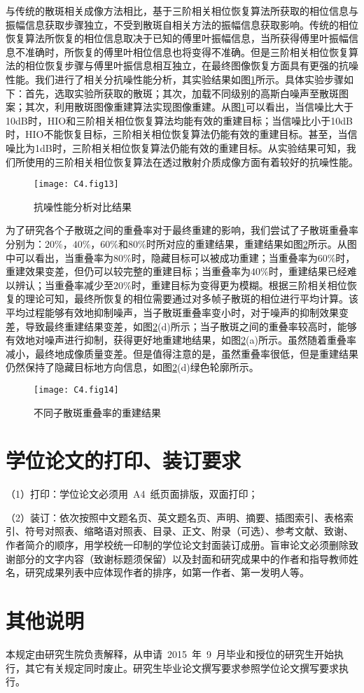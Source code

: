 与传统的散斑相关成像方法相比，基于三阶相关相位恢复算法所获取的相位信息与振幅信息获取步骤独立，不受到散斑自相关方法的振幅信息获取影响。传统的相位恢复算法所恢复的相位信息取决于已知的傅里叶振幅信息，当所获得傅里叶振幅信息不准确时，所恢复的傅里叶相位信息也将变得不准确。但是三阶相关相位恢复算法的相位恢复步骤与傅里叶振信息相互独立，在最终图像恢复方面具有更强的抗噪性能。我们进行了相关分抗噪性能分析，其实验结果如图\ref{fig:4.13}所示。具体实验步骤如下：首先，选取实验所获取的散斑；其次，加载不同级别的高斯白噪声至散斑图案；其次，利用散斑图像重建算法实现图像重建。从图\ref{fig:4.13}可以看出，当信噪比大于10dB时，HIO和三阶相关相位恢复算法均能有效的重建目标；当信噪比小于10dB时，HIO不能恢复目标，三阶相关相位恢复算法仍能有效的重建目标。甚至，当信噪比为1dB时，三阶相关相位恢复算法仍能有效的重建目标。从实验结果可知，我们所使用的三阶相关相位恢复算法在透过散射介质成像方面有着较好的抗噪性能。

\begin{figure}[htp]
	\centering
	\texttt{[image: C4.fig13]}
	\caption{抗噪性能分析对比结果}
	\label{fig:4.13}
\end{figure}

为了研究各个子散斑之间的重叠率对于最终重建的影响，我们尝试了子散斑重叠率分别为：$20\%$，$40\%$，$60\%$和$80\%$时所对应的重建结果，重建结果如图\ref{fig:4.14}所示。从图中可以看出，当重叠率为$80\%$时，隐藏目标可以被成功重建；当重叠率为$60\%$时，重建效果变差，但仍可以较完整的重建目标；当重叠率为$40\%$时，重建结果已经难以辨认；当重叠率减少至$20\%$时，重建目标为变得更为模糊。根据三阶相关相位恢复的理论可知，最终所恢复的相位需要通过对多帧子散斑的相位进行平均计算。该平均过程能够有效地抑制噪声，当子散斑重叠率变小时，对于噪声的抑制效果变差，导致最终重建结果变差，如图\ref{fig:4.14}(d)所示；当子散斑之间的重叠率较高时，能够有效地对噪声进行抑制，获得更好地重建地结果，如图\ref{fig:4.14}(a)所示。虽然随着重叠率减小，最终地成像质量变差。但是值得注意的是，虽然重叠率很低，但是重建结果仍然保持了隐藏目标地方向信息，如图\ref{fig:4.14}(d)绿色轮廓所示。

\begin{figure}[htp]
	\centering
	\texttt{[image: C4.fig14]}
	\caption{不同子散斑重叠率的重建结果}
	\label{fig:4.14}
\end{figure}



\section{学位论文的打印、装订要求}

（1）打印：学位论文必须用~A4~纸页面排版，双面打印；

（2）装订：依次按照中文题名页、英文题名页、声明、摘要、插图索引、表格索引、符号对照表、缩略语对照表、目录、正文、附录（可选）、参考文献、致谢、作者简介的顺序，用学校统一印制的学位论文封面装订成册。盲审论文必须删除致谢部分的文字内容（致谢标题须保留）以及封面和研究成果中的作者和指导教师姓名，研究成果列表中应体现作者的排序，如第一作者、第一发明人等。

\section{其他说明}

本规定由研究生院负责解释，从申请~2015~年~9~月毕业和授位的研究生开始执行，其它有关规定同时废止。研究生毕业论文撰写要求参照学位论文撰写要求执行。
